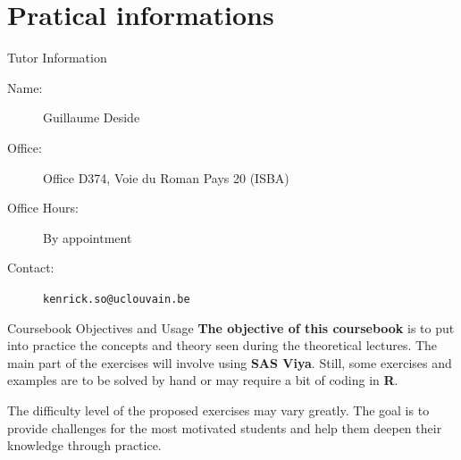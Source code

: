 \section{Pratical informations}
\begin{frame}[fragile]{Tutor Information}
\begin{description}
  \item[Name:] Guillaume Deside
  \item[Office:] Office D374, Voie du Roman Pays 20 (ISBA)
  \item[Office Hours:] By appointment
  \item[Contact:] \texttt{kenrick.so@uclouvain.be}
\end{description}
\end{frame}

\begin{frame}[fragile]{Coursebook Objectives and Usage}
\textbf{The objective of this coursebook} is to put into practice the concepts and theory 
seen during the theoretical lectures. The main part of the exercises will involve using 
\textbf{SAS Viya}. Still, some exercises and examples are to be solved by hand or may 
require a bit of coding in \textbf{R}.

\vspace{0.3cm}
The difficulty level of the proposed exercises may vary greatly. The goal is to provide challenges for the most motivated students and help them deepen their knowledge through practice.
\end{frame}

